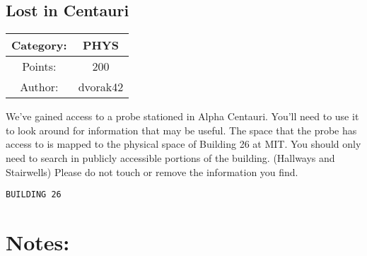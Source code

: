 \begin{center}
\section*{Lost in Centauri}
{\large
\begin{tabular}{| c c |}
\hline
Category: & PHYS\\\hline
Points: & 200\\\hline
Author: & dvorak42\\\hline
\end{tabular}
}
\end{center}
\vspace{0.5in}

{\large
We've gained access to a probe stationed in Alpha Centauri. You'll need to use it to look around for information that may be useful. The space that the probe has access to is mapped to the physical space of Building 26 at MIT. You should only need to search in publicly accessible portions of the building. (Hallways and Stairwells) Please do not touch or remove the information you find.
}
\vspace{0.25in}
\begin{center}
  {\Large\tt BUILDING 26}
\end{center}

\vspace{0.25in}
\section*{Notes:}
